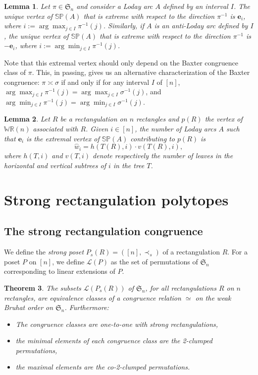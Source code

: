 \documentclass{amsart}
\newtheorem{theorem}{Theorem}%
\newtheorem{lemma}[theorem]{Lemma}
\theoremstyle{definition}
\newcommand{\f}[1]{\mathfrak{#1}} %
\newcommand{\darkblue}{\color{darkblue}} %
\newcommand{\defn}[1]{\textsl{\darkblue #1}} %
\newcommand{\polytope}[1]{\mathds{#1}} %
\newcommand{\WRP}{\polytope{WR}} %
\newcommand{\SP}{\polytope{SP}}
\newcommand{\loday}[1]{\overset{\frown}{#1}}
\newcommand{\baxtereq}{\asymp}%
\newcommand{\strongeq}{\simeq}%
\begin{document}
\begin{lemma}
  \label{lem:lodaymax}
  Let $\pi\in\f{S}_n$ and consider a Loday arc $A$ defined by an interval $I$.
  The unique vertex of $\SP(A)$ that is extreme with respect to the direction $\pi^{-1}$
  is $\mathbf{e}_i$, where $i := \arg\max_{j\in I} \pi^{-1}(j)$.
  Similarly, if $A$ is an anti-Loday arc defined by $I$, the unique vertex of $\SP(A)$ that is extreme with respect to the direction $\pi^{-1}$
  is $-\mathbf{e}_i$, where $i := \arg\min_{j\in I} \pi^{-1}(j)$.
\end{lemma}

Note that this extremal vertex should only depend on the Baxter congruence class of $\pi$.
This, in passing, gives us an alternative characterization of the Baxter congruence:
$\pi\baxtereq\sigma$ if and only if for any interval $I$ of $[n]$, $\arg\max_{j\in I} \pi^{-1}(j)=\arg\max_{j\in I} \sigma^{-1}(j)$, and
$\arg\min_{j\in I} \pi^{-1}(j)=\arg\min_{j\in I} \sigma^{-1}(j)$.

\begin{lemma}
  Let $R$ be a rectangulation on $n$ rectangles and $p(R)$ the vertex of $\WRP(n)$ associated with $R$.
  Given $i\in [n]$, the number of Loday arcs $A$ such that $\mathbf{e}_i$ is the extremal vertex of $\SP(A)$ contributing to $p(R)$ is
  \[
  \loday{w}_i =  h(T(R), i)\cdot v(T(R),i),
  \]
   where $h(T,i)$ and $v(T,i)$ denote respectively the number of leaves in the horizontal and vertical subtrees of $i$ in the tree $T$.
\end{lemma}


\section{Strong rectangulation polytopes}
\label{sec:strongRectangulationPolytopes}

\subsection{The strong rectangulation congruence}

We define the \defn{strong poset} $P_s(R)=([n],\prec_s)$ of a rectangulation $R$.
For a poset $P$ on $[n]$, we define $\mathcal{L}(P)$ as the set of permutations of $\f{S}_n$ corresponding to linear extensions of $P$.

\begin{theorem}
  The subsets $\mathcal{L}(P_s(R))$ of $\f{S}_n$, for all rectangulations $R$ on $n$ rectangles, 
  are equivalence classes of a congruence relation $\strongeq$ on the weak Bruhat order on $\f{S}_n$.
    Furthermore:
  \begin{itemize}
  \item The congruence classes are one-to-one with strong rectangulations,  
  \item the minimal elements of each congruence class are the 2-clumped permutations,
  \item the maximal elements are the co-2-clumped permutations.
  \end{itemize}
\end{theorem}
\end{document}
